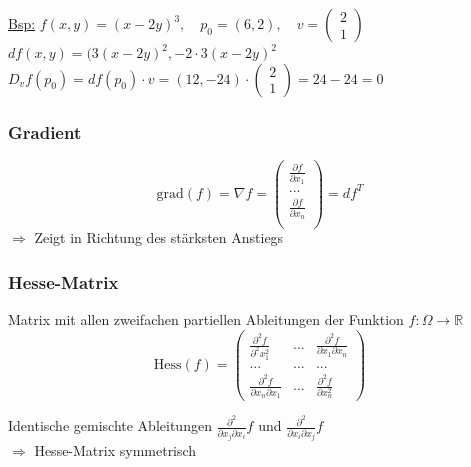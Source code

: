 \documentclass[6pt]{article}
\begin{document}
\begin{multicols*}{3}
	\underline{Bsp:}		\quad $f(x,y) = (x-2y)^3, \quad p_0=(6,2), \quad v= \begin{pmatrix} 2 \\  1 \end{pmatrix}$ \vspace{1mm}\\
	$df(x,y) = (3(x-2y)^2 , -2 \cdot 3 (x-2y)^2$ \vspace{1mm}\\
	$D_vf(p_0) = df(p_0) \cdot v = (12 , -24) \cdot \begin{pmatrix} 2 \\  1 \end{pmatrix} = 24 - 24 = 0 $ 
	
	
	
	\columnbreak
	\subsubsection*{Gradient}
		\begin{equation*}
				\text{grad}(f)=\nabla f=
				\begin{pmatrix}
						\frac{\partial f}{\partial x_1}\\
						...\\
						\frac{\partial f}{\partial x_n}\\
				\end{pmatrix}
				 = df^T
		\end{equation*}
		$\Rightarrow$ Zeigt in Richtung des st{\"a}rksten Anstiegs
	
	
	\subsubsection*{Hesse-Matrix}
		Matrix mit allen zweifachen partiellen Ableitungen der Funktion $f: \Omega \rightarrow \mathbb{R}$ 
		\begin{equation*}
			\text{Hess}(f)=
				\begin{pmatrix}
					\frac{\partial^2 f}{\partial^2x_1^2} & ... & \frac{\partial^2 f}{\partial x_1 \partial x_n}\\
					...&...&...\\
					\frac{\partial^2 f}{\partial x_n \partial x_1} & ... & \frac{\partial^2 f}{\partial x_n^2}
				\end{pmatrix}
		\end{equation*}
		
	Identische gemischte Ableitungen $\frac{\partial^2}{\partial x_j \partial x_i}f$	 und $\frac{\partial^2}{\partial x_i \partial x_j}f$\\
	$\Rightarrow $ Hesse-Matrix symmetrisch
	\vspace{5mm}
	

\end{multicols*}
\end{document}
